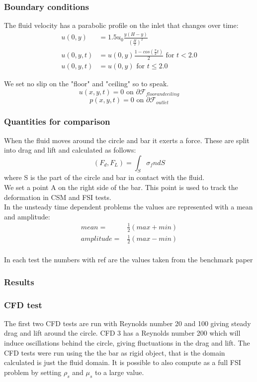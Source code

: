 \subsubsection*{Boundary conditions}
The fluid velocity has a parabolic profile on the inlet that changes over time:\\

\begin{align*}
u(0,y) &= 1.5u_0 \frac{y(H-y)}{(\frac{H}{2})^2}  \\
u(0,y,t) &= u(0,y)\frac{1-cos(\frac{\pi}{2}t)}{2} \text{  for  } t<2.0 \\
u(0,y,t) &= u(0,y) \text{  for  } t \leq 2.0
\end{align*}

We set no slip on the "floor" and "ceiling" so to speak.\\
$$ u(x,y,t) = 0 \text{  on  } \partial \mathcal{F}_{floor and ceiling} $$
$$  p(x,y,t) = 0 \text{  on  } \partial \mathcal{F}_{outlet} $$

\subsubsection*{Quantities for comparison}
When the fluid moves around the circle and bar it exerts a force. These are split into drag and lift and calculated as follows:
$$ (F_d, F_L) = \int_S \sigma_f n dS $$ 
where S is the part of the circle and bar in contact with the fluid. \\
We set a point A on the right side of the bar. This point is used to track the deformation in CSM and FSI tests. \\
In the unsteady time dependent problems the values are represented with a mean and amplitude:
\begin{align}
mean =& \frac{1}{2} (max + min) \\
amplitude =& \frac{1}{2} (max - min)\\
\end{align}

In each test the numbers with ref are the values taken from the benchmark paper \cite{Hron2006a}

\subsubsection{Results}
\subsubsection{CFD test}
The first two CFD tests are run with Reynolds number 20 and 100 giving steady drag and lift around the circle. CFD 3 has a Reynolds number 200 which will induce oscillations behind the circle, giving fluctuations in the drag and lift.
The CFD tests were run using the the bar as rigid object, that is the domain calculated is just the fluid domain. It is possible to also compute as a full FSI problem by setting $\rho_s$ and $\mu_s$ to a large value. 

